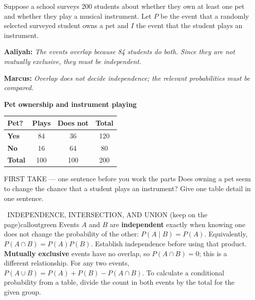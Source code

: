 \documentclass[11pt]{article}
\begin{document}


Suppose a school surveys 200 students about whether they own at least one pet and whether they play a musical instrument. Let $P$ be the event that a randomly selected surveyed student owns a pet and $I$ the event that the student plays an instrument.\par\smallskip \textbf{Aaliyah:} \emph{The events overlap because 84 students do both. Since they are not mutually exclusive, they must be independent.}\par \textbf{Marcus:} \emph{Overlap does not decide independence; the relevant probabilities must be compared.}\par
\begin{center}
\textbf{Pet ownership and instrument playing}\par\smallskip
\begin{tabular}{|l|c|c|c|}
\hline
\textbf{Pet?} & \textbf{Plays} & \textbf{Does not} & \textbf{Total} \\ \hline
\textbf{Yes} & 84 & 36 & 120 \\ \hline
\textbf{No} & 16 & 64 & 80 \\ \hline
\textbf{Total} & 100 & 100 & 200 \\ \hline
\end{tabular}
\end{center}
\begin{firsttakebox}{FIRST TAKE --- one sentence before you work the parts}
Does owning a pet seem to change the chance that a student plays an instrument? Give one table detail in one sentence.
\workspace{0.9in}
\end{firsttakebox}

\begin{callout}{\IconBook\ INDEPENDENCE, INTERSECTION, AND UNION (keep on the page)}{calloutgreen}
Events $A$ and $B$ are \textbf{independent} exactly when knowing one does not change the probability of the other:
$P(A\mid B)=P(A)$. Equivalently, $P(A\cap B)=P(A)P(B)$. Establish independence before using that product.
\textbf{Mutually exclusive} events have no overlap, so $P(A\cap B)=0$; this is a different relationship.
For any two events, $P(A\cup B)=P(A)+P(B)-P(A\cap B)$. To calculate a conditional probability from a table, divide the count in both events by the total for the given group.
\end{callout}
\end{document}
